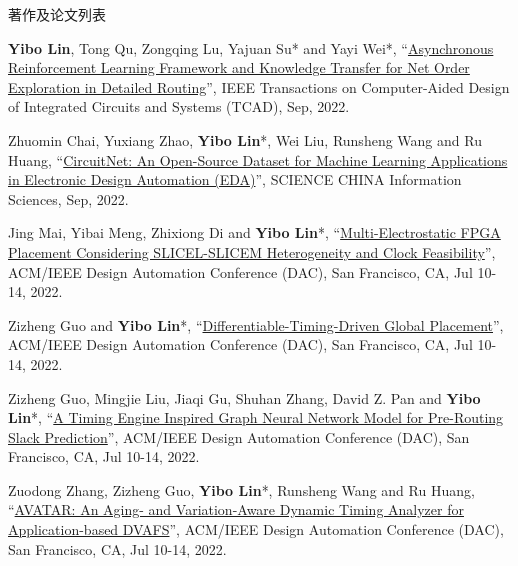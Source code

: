\begin{rSection}{著作及论文列表}
\begin{description}[font=\normalfont, rightmargin=2em]
{}
            

\item[{[J98]}]{
        \textbf{Yibo Lin}, Tong Qu, Zongqing Lu, Yajuan Su* and Yayi Wei*, 
    ``\href{https://doi.org/10.1109/TCAD.2021.3117505}{Asynchronous Reinforcement Learning Framework and Knowledge Transfer for Net Order Exploration in Detailed Routing}'', 
    IEEE Transactions on Computer-Aided Design of Integrated Circuits and Systems (TCAD), Sep, 2022.
    
}
            

\item[{[J97]}]{
        Zhuomin Chai, Yuxiang Zhao, \textbf{Yibo Lin}*, Wei Liu, Runsheng Wang and Ru Huang, 
    ``\href{https://doi.org/10.1007/s11432-022-3571-8}{CircuitNet: An Open-Source Dataset for Machine Learning Applications in Electronic Design Automation (EDA)}'', 
    SCIENCE CHINA Information Sciences, Sep, 2022.
    
}
            

\item[{[C96]}]{
        Jing Mai, Yibai Meng, Zhixiong Di and \textbf{Yibo Lin}*, 
    ``\href{https://doi.org/10.1145/3489517.3530568}{Multi-Electrostatic FPGA Placement Considering SLICEL-SLICEM Heterogeneity and Clock Feasibility}'', 
    ACM/IEEE Design Automation Conference (DAC), San Francisco, CA, Jul 10-14, 2022.
    
}
            

\item[{[C95]}]{
        Zizheng Guo and \textbf{Yibo Lin}*, 
    ``\href{https://doi.org/10.1145/3489517.3530486}{Differentiable-Timing-Driven Global Placement}'', 
    ACM/IEEE Design Automation Conference (DAC), San Francisco, CA, Jul 10-14, 2022.
    
}
            

\item[{[C94]}]{
        Zizheng Guo, Mingjie Liu, Jiaqi Gu, Shuhan Zhang, David Z. Pan and \textbf{Yibo Lin}*, 
    ``\href{https://doi.org/10.1145/3489517.3530597}{A Timing Engine Inspired Graph Neural Network Model for Pre-Routing Slack Prediction}'', 
    ACM/IEEE Design Automation Conference (DAC), San Francisco, CA, Jul 10-14, 2022.
    
}
            

\item[{[C93]}]{
        Zuodong Zhang, Zizheng Guo, \textbf{Yibo Lin}*, Runsheng Wang and Ru Huang, 
    ``\href{https://doi.org/10.1145/3489517.3530530}{AVATAR: An Aging- and Variation-Aware Dynamic Timing Analyzer for Application-based DVAFS}'', 
    ACM/IEEE Design Automation Conference (DAC), San Francisco, CA, Jul 10-14, 2022.
    
}
\end{description}
\end{rSection}
